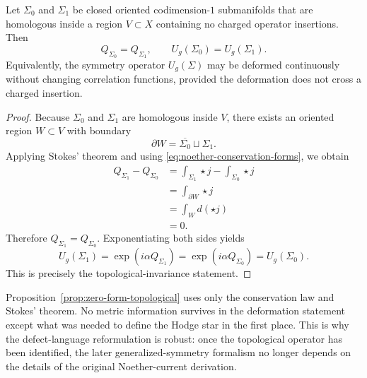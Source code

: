 \begin{proposition}\label{prop:zero-form-topological}
Let $\Sigma_0$ and $\Sigma_1$ be closed oriented codimension-$1$ submanifolds that are homologous inside a region $V \subset X$ containing no charged operator insertions. Then
\begin{equation}\label{eq:QSigma-invariant}
Q_{\Sigma_0}=Q_{\Sigma_1},
\qquad
U_g(\Sigma_0)=U_g(\Sigma_1).
\end{equation}
Equivalently, the symmetry operator $U_g(\Sigma)$ may be deformed continuously without changing correlation functions, provided the deformation does not cross a charged insertion.
\end{proposition}

\begin{proof}
Because $\Sigma_0$ and $\Sigma_1$ are homologous inside $V$, there exists an oriented region $W \subset V$ with boundary
\begin{equation*}
\partial W = \overline{\Sigma_0}\sqcup \Sigma_1.
\end{equation*}
Applying Stokes' theorem and using \eqref{eq:noether-conservation-forms}, we obtain
\begin{align*}
Q_{\Sigma_1}-Q_{\Sigma_0}
&=
\int_{\Sigma_1}\star j-\int_{\Sigma_0}\star j \\
&=
\int_{\partial W}\star j \\
&=
\int_W d(\star j) \\
&= 0.
\end{align*}
Therefore $Q_{\Sigma_1}=Q_{\Sigma_0}$. Exponentiating both sides yields
\begin{equation*}
U_g(\Sigma_1)=\exp(i\alpha Q_{\Sigma_1})
=
\exp(i\alpha Q_{\Sigma_0})
=
U_g(\Sigma_0).
\end{equation*}
This is precisely the topological-invariance statement.
\end{proof}

\begin{remark}\label{rem:zero-form-ingredients}
Proposition~\ref{prop:zero-form-topological} uses only the conservation law and Stokes' theorem. No metric information survives in the deformation statement except what was needed to define the Hodge star in the first place. This is why the defect-language reformulation is robust: once the topological operator has been identified, the later generalized-symmetry formalism no longer depends on the details of the original Noether-current derivation.
\end{remark}

